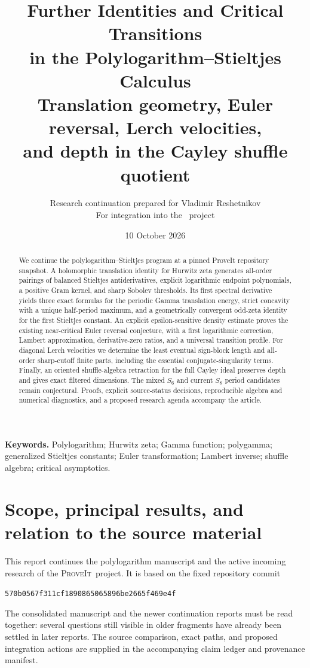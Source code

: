 \documentclass[11pt,a4paper]{article}
\title{\textbf{Further Identities and Critical Transitions\\
in the Polylogarithm--Stieltjes Calculus}\\[7pt]
\large Translation geometry, Euler reversal, Lerch velocities,\\
and depth in the Cayley shuffle quotient}
\author{Research continuation prepared for Vladimir Reshetnikov\\
\normalsize For integration into the \repo\ project}
\date{10 October 2026}
\numberwithin{equation}{section}
\theoremstyle{definition}
\theoremstyle{remark}
\newcommand{\repo}{\textsc{ProveIt}}
\newcommand{\baselinecommit}{570b0567f311cf1890865065896be2665f469e4f}
\begin{document}
\maketitle
\begin{abstract}
We continue the polylogarithm--Stieltjes program at a pinned ProveIt
repository snapshot. A holomorphic translation identity for Hurwitz zeta
generates all-order pairings of balanced Stieltjes antiderivatives,
explicit logarithmic endpoint polynomials, a positive Gram kernel,
and sharp Sobolev thresholds. Its first spectral derivative yields
three exact formulas for the periodic Gamma translation energy,
strict concavity with a unique half-period maximum, and a geometrically
convergent odd-zeta identity for the first Stieltjes constant.
An explicit epsilon-sensitive density estimate proves the existing
near-critical Euler reversal conjecture, with a first logarithmic
correction, Lambert approximation, derivative-zero ratios, and a
universal transition profile. For diagonal Lerch velocities we determine
the least eventual sign-block length and all-order sharp-cutoff finite
parts, including the essential conjugate-singularity terms.
Finally, an oriented shuffle-algebra retraction for the full Cayley ideal
preserves depth and gives exact filtered dimensions. The mixed $S_6$
and current $S_8$ period candidates remain conjectural. Proofs, explicit
source-status decisions, reproducible algebra and numerical diagnostics,
and a proposed research agenda accompany the article.
\end{abstract}
\vspace{4pt}
\noindent\textbf{Keywords.} Polylogarithm; Hurwitz zeta; Gamma function;
polygamma; generalized Stieltjes constants; Euler transformation;
Lambert inverse; shuffle algebra; critical asymptotics.
\clearpage
{\small\setlength{\parskip}{0pt}\tableofcontents}
\clearpage

\section{Scope, principal results, and relation to the source material}
\label{sec:scope}

This report continues the polylogarithm manuscript and the active incoming
research of the \repo\ project. It is based on the fixed repository commit
\begin{center}\small\texttt{\baselinecommit}\end{center}
The consolidated manuscript and the newer
continuation reports must be read together: several questions still visible
in older fragments have already been settled in later reports. The source
comparison, exact paths, and proposed integration actions are supplied in
the accompanying claim ledger and provenance manifest.
\end{document}
